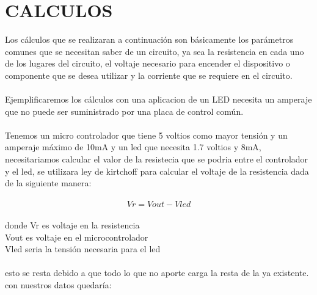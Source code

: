 \documentclass[13pt]{article}
\begin{document}
\section{CALCULOS}
Los cálculos que se realizaran a continuación son básicamente los parámetros comunes que se necesitan saber de un circuito, ya sea la resistencia en cada uno de los lugares del circuito, el voltaje necesario para encender el dispositivo o componente que se desea utilizar y la corriente que se requiere en el circuito.\\\\
Ejemplificaremos los cálculos con una aplicacion de un LED necesita un amperaje que no puede ser suministrado por una placa de control común.\\
\\
Tenemos un micro controlador que tiene 5 voltios como mayor tensión y un amperaje máximo de 10mA y un led que necesita 1.7 voltios y 8mA, necesitariamos calcular el valor de la resistecia que se podria entre el controlador y el led, se utilizara ley de kirtchoff para calcular el voltaje de la resistencia dada de la siguiente manera:\\\\

$$Vr=Vout-Vled$$\\
donde Vr es voltaje en la resistencia\\
Vout es voltaje en el microcontrolador\\
Vled seria la tensión necesaria para el led\\
\\
esto se resta  debido a que todo lo que no aporte carga la resta de la ya existente.\\
con nuestros datos quedaría:\\
\end{document}
